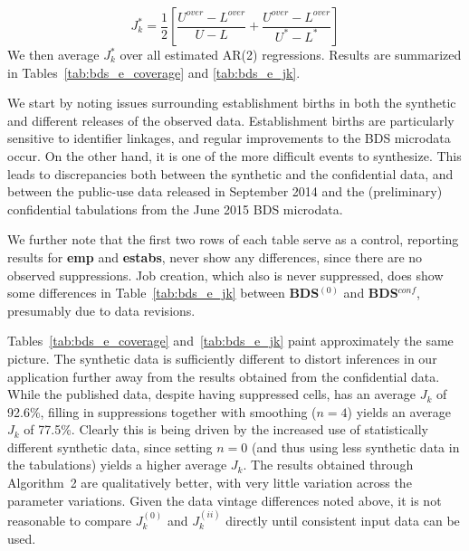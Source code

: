 $$
J_k^{*} = \frac{1}{2} \left [ \frac{U^{over} - L^{over}}{U-L} + \frac{U^{over} - L^{over}}{U^*-L ^*}        \right ]
$$
We then average $J_k^{*}$ over all estimated AR(2) regressions.
Results are summarized in Tables~\ref{tab:bds_e_coverage} and \ref{tab:bds_e_jk}.

%
%

We start by noting issues surrounding establishment births in both the synthetic and different 
releases of the observed data. Establishment births are particularly sensitive to identifier 
linkages, and regular improvements to the BDS microdata occur. On the other hand, it is one of 
the more difficult events to synthesize. This leads to discrepancies both between the synthetic 
and the confidential data, and between the public-use data released in September 2014 and the 
(preliminary) confidential tabulations from the June 2015 BDS microdata. 

We further note that the first two rows of each table serve as a control, reporting results for 
\textbf{emp} and 
\textbf{estabs}, never show any differences, since there are no observed suppressions. Job 
creation, which also is never suppressed, does show some differences in 
Table~\ref{tab:bds_e_jk} between \textbf{BDS$^{(0)}$} and \textbf{BDS$^{conf}$}, presumably 
due to data revisions.

Tables~\ref{tab:bds_e_coverage} and~\ref{tab:bds_e_jk} paint approximately the same picture. 
The synthetic data is sufficiently different to distort inferences in our application further away 
from the results obtained from the confidential data. While the published data, despite having 
suppressed cells, has an average $J_k$ of 92.6\%, filling in suppressions together with smoothing 
($n=4$) yields an average $J_k$ of 77.5\%. Clearly this is being driven by the increased use of 
statistically different synthetic data, since setting $n=0$ (and thus using less synthetic data in the 
tabulations) yields a higher average $J_k$. The results obtained through Algorithm~2 are 
qualitatively better, with very little variation across the parameter variations. Given the data 
vintage differences noted above, it is not reasonable to compare $J_k^{(0)}$ and $J_k^{(ii)}$ 
directly until consistent input data can be used.



